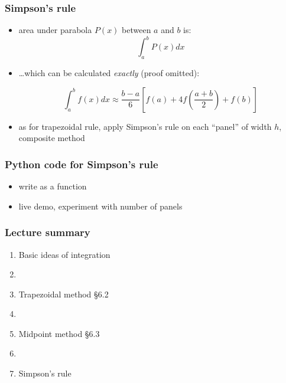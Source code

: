 \documentclass[english,14pt]{beamer}
\newcommand\red[1]{{\color{red} #1}}
\begin{document}
\begin{frame}[fragile]

\frametitle{Simpson's rule}

\begin{itemize}
	\item area under parabola $P(x)$ between $a$ and $b$ is:
\[
\int_a^b P(x) dx
\]
\item[] \ldots which can be calculated \emph{exactly} (proof omitted):

\[
\int_a^b f(x)dx \approx \frac{b-a}{6} \left[ f(a) + 4f\left(\frac{a+b}{2}\right) + f(b)\right]
\]
\item as for trapezoidal rule, apply Simpson's rule on each ``panel'' of width $h$, composite method
\end{itemize}

\end{frame}


\begin{frame}[fragile]

\frametitle{Python code for Simpson's rule}

\begin{itemize}
	\item write as a function
	\item live demo, experiment with number of panels
\end{itemize}

\end{frame}


\begin{frame}[fragile]

\frametitle{Lecture summary}

\begin{enumerate}
	\item Basic ideas of integration
	
	\item[]
	
	\item Trapezoidal method \red{\S6.2}
	
	\item[]
	
	\item Midpoint method \red{\S6.3}
	
	\item[]
	
	\item Simpson's rule
	
\end{enumerate}

\end{frame}
\end{document}
